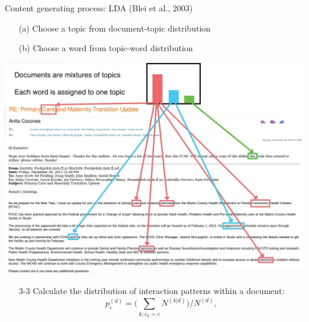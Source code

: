 \documentclass[10pt, xcolor=table]{beamer}
\theoremstyle{definition}
\theoremstyle{remark}
\begin{document}
\begin{frame}{Content generating process: LDA (Blei et al., 2003)}
\begin{minipage}{0.68\linewidth}
\begin{itemize}
		\begin{itemize}
			\item[(a)] Choose a topic from document-topic distribution\vspace{0.2cm} 
			\item[(b)] Choose a word from topic-word distribution
		\end{itemize} 
			\end{itemize}
		\end{minipage}
		\begin{minipage}{0.3\linewidth}
	\includegraphics[width=1.05\textwidth]{figures/LDAimage.jpeg}
		\end{minipage}
		\vspace{0.2cm}
				\begin{itemize}\item[3-3] Calculate the distribution of interaction patterns within a document:
		 \footnotesize\begin{equation*}
		p_c^{(d)} = \Big({\sum\limits_{k: c_k=c} N^{(k|d)}}\Big)/{N^{(d)}},
		\end{equation*}\normalsize
	\end{itemize}
\ei	
\end{frame}
\end{document}
